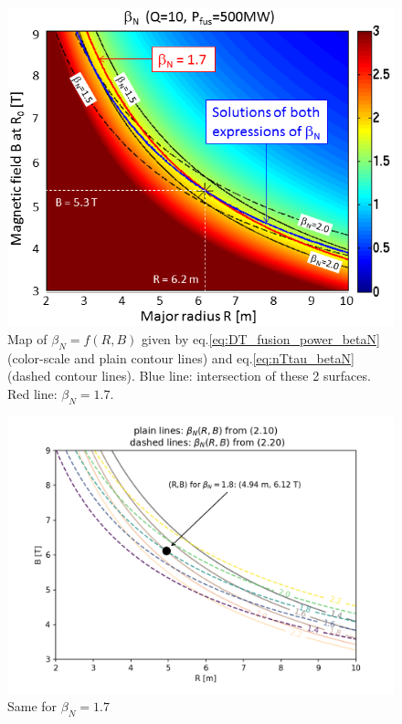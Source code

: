 \begin{figure}[h]
	\centering
	\includegraphics[width=1\textwidth]{figures/Fig_2D_betaN_R_B_ITER_v3.png}%
	\caption{Map of $\beta_N=f(R,B)$ given by eq.\ref{eq:DT_fusion_power_betaN} (color-scale and plain contour lines) and eq.\ref{eq:nTtau_betaN} (dashed contour lines). Blue line: intersection of these 2 surfaces. Red line: $\beta_N = 1.7$.}
\end{figure}

\begin{figure}[h]
	\centering
	\includegraphics[width=1\textwidth]{figures/beta_N.png}
	\caption{Same for $\beta_N=1.7$}
	\label{fig:solutions_betaN2}
\end{figure}


